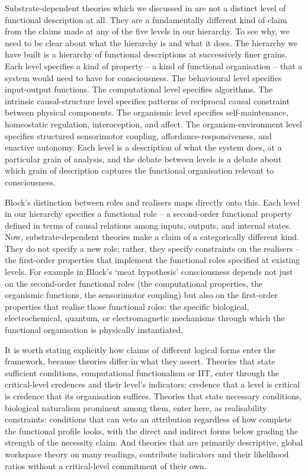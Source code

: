 \documentclass[11pt, a4paper, onecolumn, gdm]{google}
\begin{document}
Substrate-dependent theories which we discussed in  are not a distinct level of functional description at all.
They are a fundamentally different kind of claim from the claims made at any of the five levels in our hierarchy.
To see why, we need to be clear about what the hierarchy is and what it does.
The hierarchy we have built is a hierarchy of functional descriptions at successively finer grains.
Each level specifies a kind of property -- a kind of functional organisation -- that a system would need to have for consciousness.
The behavioural level specifies input-output functions.
The computational level specifies algorithms.
The intrinsic causal-structure level specifies patterns of reciprocal causal constraint between physical components.
The organismic level specifies self-maintenance, homeostatic regulation, interoception, and affect.
The organism-environment level specifies structured sensorimotor coupling, affordance-responsiveness, and enactive autonomy.
Each level is a description of what the system does, at a particular grain of analysis, and the debate between levels is a debate about which grain of description captures the functional organisation relevant to consciousness.

Block's distinction \citep{block2025} between roles and realisers maps directly onto this.
Each level in our hierarchy specifies a functional role -- a second-order functional property defined in terms of causal relations among inputs, outputs, and internal states.
Now, substrate-dependent theories make a claim of a categorically different kind.
They do not specify a new role; rather, they specify constraints on the realisers -- the first-order properties that implement the functional roles specified at existing levels.
For example in Block's `meat hypothesis' consciousness depends not just on the second-order functional roles (the computational properties, the organismic functions, the sensorimotor coupling) but also on the first-order properties that realise those functional roles: the specific biological, electrochemical, quantum, or electromagnetic mechanisms through which the functional organisation is physically instantiated.

It is worth stating explicitly how claims of different logical forms enter the framework, because theories differ in what they assert.
Theories that state sufficient conditions, computational functionalism or IIT, enter through the critical-level credences and their level's indicators: credence that a level is critical is credence that its organisation suffices.
Theories that state necessary conditions, biological naturalism prominent among them, enter here, as realisability constraints: conditions that can veto an attribution regardless of how complete the functional profile looks, with the direct and indirect forms below grading the strength of the necessity claim.
And theories that are primarily descriptive, global workspace theory on many readings, contribute indicators and their likelihood ratios without a critical-level commitment of their own.
\end{document}
